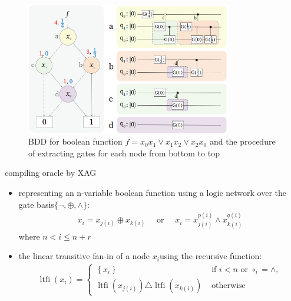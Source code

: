   \begin{frame}
    \begin{figure}[htbq]
      \centering
      \includegraphics[width=0.8\textwidth]{figure/qsp_circuit.png}
      \caption{BDD  for boolean function $f= x_0x_1\vee x_1x_2 \vee x_2x_0 $ and  the  procedure  of  extracting  gates  for  each node from bottom to top} 
      \label{fig-qsp-example-circuit}
    \end{figure}
  \end{frame}
  \begin{frame}{compiling oracle by XAG}
    \begin{itemize}
      \item representing an n-variable boolean function using a logic network over the gate basis$\{\lnot ,\oplus ,\wedge \}$:
      \begin{align}
        x_{i} = x_{j(i)} \oplus x_{k(i)} \quad \text { or } \quad x_{i} = x_{j(i)}^{p(i)} \wedge x_{k(i)}^{q(i)}
      \end{align}
      where $n< i \leq n+r$
      \item  the linear transitive fan-in of a node $x_i $using the recursive function:
      \begin{align}
        \operatorname{ltfi}\left(x_{i}\right) = \left\{\begin{array}{ll}
        \left\{x_{i}\right\} & \text { if } i < n \text { or } \circ_{i}  = \wedge, \\
        \operatorname{ltfi}\left(x_{j(i)}\right) \triangle \operatorname{ltfi}\left(x_{k(i)}\right) & \text { otherwise }
        \end{array}\right.
      \end{align}
    \end{itemize}
  \end{frame}
